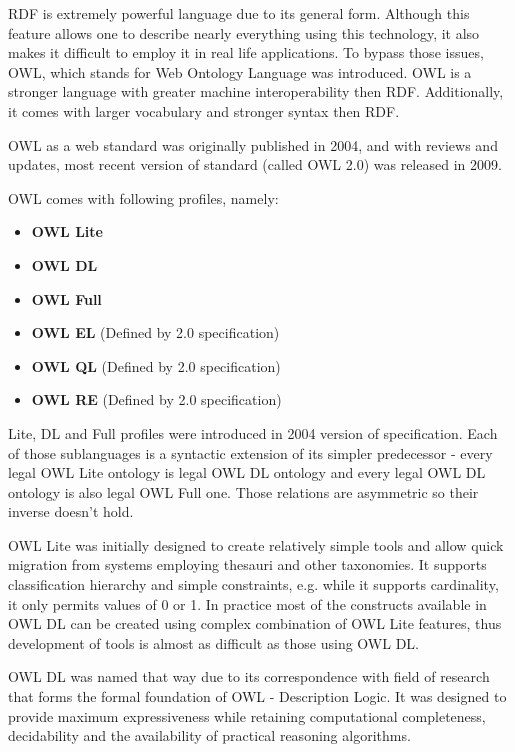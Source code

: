 RDF is extremely powerful language due to its general form. Although this feature allows one to describe nearly everything using this technology, it also makes it difficult to employ it in real life applications. To bypass those issues, OWL, which stands for Web Ontology Language was introduced. OWL is a stronger language with greater machine interoperability then RDF. Additionally, it comes with larger vocabulary and stronger syntax then RDF.

OWL as a web standard was originally published in 2004, and with reviews and updates, most recent version of standard (called OWL 2.0) was released in 2009\cite{owlRef:2009, owlPrimer:2009}.

OWL comes with following profiles, namely:

\begin{itemize}
\item{ {\bf OWL Lite}}
\item{ {\bf OWL DL}}
\item{ {\bf OWL Full}}
\item{ {\bf OWL EL} (Defined by 2.0 specification)}
\item{ {\bf OWL QL} (Defined by 2.0 specification)}
\item{ {\bf OWL RE} (Defined by 2.0 specification)}
\end{itemize}

Lite, DL and Full profiles were introduced in 2004 version of specification. Each of those sublanguages is a syntactic extension of its simpler predecessor - every legal OWL Lite ontology is legal OWL DL ontology and every legal OWL DL ontology is also legal OWL Full one. Those relations are asymmetric so their inverse doesn\rq{}t hold. 

OWL Lite was initially designed to create relatively simple tools and allow quick migration from systems employing thesauri and other taxonomies. It supports classification hierarchy and simple constraints, e.g. while it supports cardinality, it only permits values of 0 or 1. In practice most of the constructs available in OWL DL can be created using complex combination of OWL Lite features, thus development of tools is almost as difficult as those using OWL DL. 

OWL DL was named that way due to its correspondence with field of research that forms the formal foundation of OWL - Description Logic. It was designed to provide maximum expressiveness while retaining computational completeness, decidability and the availability of practical reasoning algorithms. 

